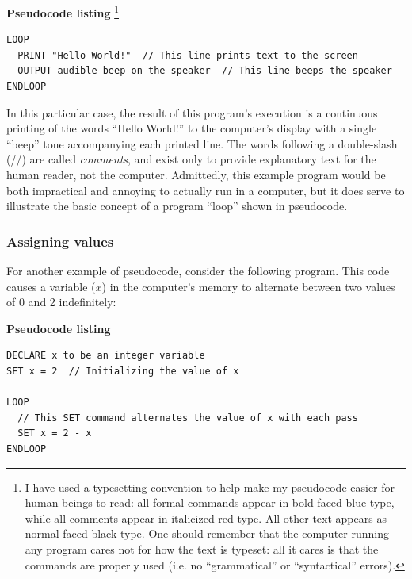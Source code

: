 \vskip 10pt

\textbf{Pseudocode listing} \footnote{I have used a typesetting convention to help make my pseudocode easier for human beings to read: all formal commands appear in bold-faced blue type, while all comments appear in italicized red type.  All other text appears as normal-faced black type.  One should remember that the computer running any program cares not for how the text is typeset: all it cares is that the commands are properly used (i.e. no ``grammatical'' or ``syntactical'' errors).}

\lstset{language=pseudocode}
\begin{lstlisting}
LOOP
  PRINT "Hello World!"  // This line prints text to the screen
  OUTPUT audible beep on the speaker  // This line beeps the speaker
ENDLOOP
\end{lstlisting}

\vskip 10pt

In this particular case, the result of this program's execution is a continuous printing of the words ``Hello World!'' to the computer's display with a single ``beep'' tone accompanying each printed line.  The words following a double-slash (//) are called \textit{comments}, and exist only to provide explanatory text for the human reader, not the computer.  Admittedly, this example program would be both impractical and annoying to actually run in a computer, but it does serve to illustrate the basic concept of a program ``loop'' shown in pseudocode.





\filbreak
\subsubsection{Assigning values}

For another example of pseudocode, consider the following program.  This code causes a variable ($x$) in the computer's memory to alternate between two values of 0 and 2 indefinitely:  

\vskip 10pt

\textbf{Pseudocode listing}

\lstset{language=pseudocode}
\begin{lstlisting}
DECLARE x to be an integer variable
SET x = 2  // Initializing the value of x

LOOP
  // This SET command alternates the value of x with each pass
  SET x = 2 - x  
ENDLOOP
\end{lstlisting}

